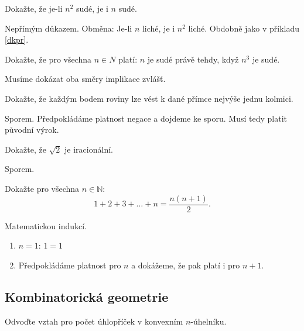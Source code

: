 \begin{priklad}
Dokažte, že je-li $n^2$ sudé, je i $n$ sudé.
\end{priklad}

\begin{reseni}
Nepřímým důkazem. Obměna: Je-li $n$ liché, je i $n^2$ liché. Obdobně jako v příkladu \ref{dkpr}.
\end{reseni}

\begin{priklad}
Dokažte, že pro všechna $n\in N$ platí: $n$ je sudé právě tehdy, když $n^3$ je sudé.
\end{priklad}

\begin{reseni}
Musíme dokázat oba směry implikace zvlášť.
\end{reseni}

\begin{priklad}
Dokažte, že každým bodem roviny lze vést k dané přímce nejvýše jednu kolmici.
\end{priklad}

\begin{reseni}
Sporem. Předpokládáme platnost negace a dojdeme ke sporu. Musí tedy platit původní výrok.
\end{reseni}

\begin{priklad}
Dokažte, že $\sqrt{2} $ je iracionální.
\end{priklad}

\begin{reseni}
Sporem.
\end{reseni}

\begin{priklad}
Dokažte pro všechna $n\in \mathbb N: $
$$1+2+3+\dots+n=\frac{n(n+1)}{2}.$$
\end{priklad}

\begin{reseni}
Matematickou indukcí.
\begin{enumerate}[1.]
\item $n=1$: $1=1$
\item Předpokládáme platnost pro $n$ a dokážeme, že pak platí i pro $n+1$.
\end{enumerate}
\end{reseni}

\subsection{Kombinatorická geometrie}
\begin{priklad}
Odvoďte vztah pro počet úhlopříček v konvexním $n$-úhelníku.
\end{priklad}

